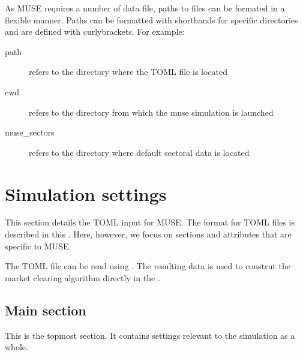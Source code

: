 \documentclass[letterpaper,10pt,english]{sphinxmanual}
\begin{document}
As MUSE requires a number of data file, paths to files can be formated in a flexible manner. Paths can be formatted with shorthands for specific directories and are defined with curly\sphinxhyphen{}brackets. For example:

\begin{sphinxVerbatim}[commandchars=\\\{\}]
  
  
  
\end{sphinxVerbatim}
\begin{description}
\item[{path}] \leavevmode
refers to the directory where the TOML file is located

\item[{cwd}] \leavevmode
refers to the directory from which the muse simulation is launched

\item[{muse\_sectors}] \leavevmode
refers to the directory where default sectoral data is located

\end{description}


\section{Simulation settings}
\label{\detokenize{inputs/toml:simulation-settings}}\label{\detokenize{inputs/toml:id1}}\label{\detokenize{inputs/toml::doc}}
This section details the TOML input for MUSE. The format for TOML files is
described in this {\hyperref[\detokenize{inputs/toml_primer:toml-primer}]{}}. Here, however, we focus on sections and
attributes that are specific to MUSE.

The TOML file can be read using . The resulting
data is used to construt the market clearing algorithm directly in the .


\subsection{Main section}
\label{\detokenize{inputs/toml:main-section}}
This is the topmost section. It contains settings relevant to the simulation as
a whole.
\end{document}
